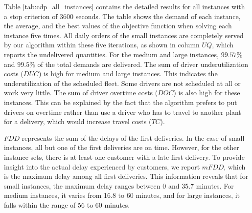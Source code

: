\documentclass{article}
\begin{document}
Table \ref{tab:cdp_all_instances} contains the detailed results for all instances with a stop criterion of 3600 seconds. The table shows the demand of each instance, the average, and the best values of the objective function when solving each instance five times. All daily orders of the small instances are completely served by our algorithm within these five iterations, as shown in column $UQ$, which reports the undelivered quantities. For the medium and large instances, $99.57\%$ and $99.5\%$ of the total demands are delivered. The sum of driver underutilization costs ($DUC$) is high for medium and large instances. This indicates the underutilization of the scheduled fleet. Some drivers are not scheduled at all or work very little. The sum of driver overtime costs ($DOC$) is also high for these instances. This can be explained by the fact that the algorithm prefers to put drivers on overtime rather than use a driver who has to travel to another plant for a delivery, which would increase travel costs ($TC$).

$FDD$ represents the sum of the delays of the first deliveries. In the case of small instances, all but one of the first deliveries are on time. However, for the other instance sets, there is at least one customer with a late first delivery. To provide insight into the actual delay experienced by customers, we report $mFDD$, which is the maximum delay among all first deliveries. This information reveals that for small instances, the maximum delay ranges between 0 and 35.7 minutes. For medium instances, it varies from 16.8 to 60 minutes, and for large instances, it falls within the range of 56 to 60 minutes.
\end{document}
